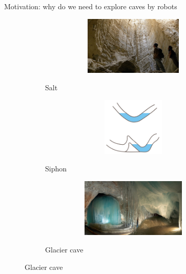 \documentclass[aspectratio=169]{beamer}
\begin{document}
\begin{frame}[t]{Motivation: why do we need to explore caves by robots}
    \vspace{-0.7cm}
    \begin{figure}[H]
        \begin{subfigure}[b]{0.3\textwidth}
            \centering\includegraphics[height=2.8cm,width=1\textwidth,keepaspectratio]{surface_types/salt.jpg}\\
            \caption*{Salt}
            \label{fig:salt}
        \end{subfigure}
        \hfill
        \begin{subfigure}[b]{0.3\textwidth}
            \centering\includegraphics[height=2.8cm,width=1\textwidth,keepaspectratio]{surface_types/siphon.png}\\
            \caption*{Siphon}
            \label{fig:siphon}
        \end{subfigure}
        \hfill
        \begin{subfigure}[b]{0.3\textwidth}
            \centering\includegraphics[height=2.8cm,width=1\textwidth,keepaspectratio]{surface_types/ice.png}\\
            \caption*{Glacier cave}
            \label{fig:ice}
        \end{subfigure}


\end{figure}
\end{frame}
\end{document}
